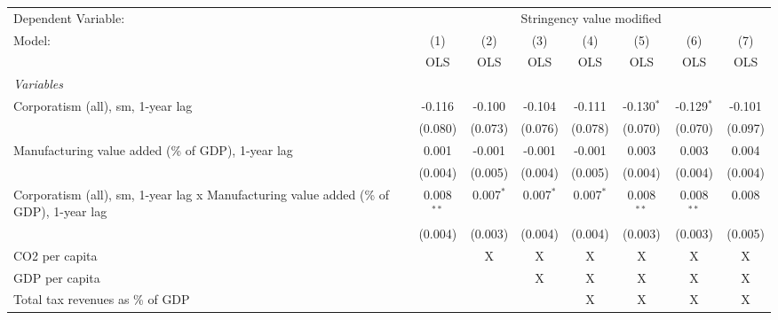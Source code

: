 
\begingroup
\centering
\begin{tabular}{lccccccc}
   \toprule
   Dependent Variable: & \multicolumn{7}{c}{Stringency value modified}\\
   Model:                                                                                 & (1)          & (2)         & (3)         & (4)         & (5)          & (6)          & (7)\\  
                                                                                          &  OLS         & OLS         & OLS         & OLS         & OLS          & OLS          & OLS\\  
   \midrule
   \emph{Variables}\\
   Corporatism (all), sm, 1-year lag                                                      & -0.116       & -0.100      & -0.104      & -0.111      & -0.130$^{*}$ & -0.129$^{*}$ & -0.101\\   
                                                                                          & (0.080)      & (0.073)     & (0.076)     & (0.078)     & (0.070)      & (0.070)      & (0.097)\\   
   Manufacturing value added (\% of GDP), 1-year lag                                      & 0.001        & -0.001      & -0.001      & -0.001      & 0.003        & 0.003        & 0.004\\   
                                                                                          & (0.004)      & (0.005)     & (0.004)     & (0.005)     & (0.004)      & (0.004)      & (0.004)\\   
   Corporatism (all), sm, 1-year lag x Manufacturing value added (\% of GDP), 1-year lag  & 0.008$^{**}$ & 0.007$^{*}$ & 0.007$^{*}$ & 0.007$^{*}$ & 0.008$^{**}$ & 0.008$^{**}$ & 0.008\\   
                                                                                          & (0.004)      & (0.003)     & (0.004)     & (0.004)     & (0.003)      & (0.003)      & (0.005)\\   
   CO2 per capita                                                                         &              & X           & X           & X           & X            & X            & X\\  
   GDP per capita                                                                         &              &             & X           & X           & X            & X            & X\\  
   Total tax revenues as \% of GDP                                                        &              &             &             & X           & X            & X            & X\\  

\end{tabular}
